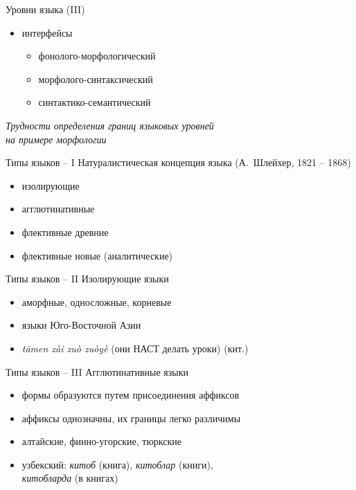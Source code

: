 \documentclass{beamer}
\begin{document}
\begin{frame}{Уровни языка (III)}
\begin{itemize}
	\item интерфейсы 
	    \begin{itemize}
	    	\item фонолого-морфологический
	    	\item морфолого-синтаксический
	    	\item синтактико-семантический
	    \end{itemize}
\end{itemize}
\end{frame}

\begin{frame}{}
\begin{center}
	\textit{Трудности определения границ языковых уровней \\на примере морфологии}
\end{center}
\end{frame}

\begin{frame}{Типы языков -- I}
Натуралистическая концепция языка (А.~Шлейхер, 1821 -- 1868)\\
\medskip
\begin{itemize}
\item изолирующие
\item агглютинативные
\item флективные древние
\item флективные новые (аналитические)
\end{itemize}
\end{frame}

\begin{frame}{Типы языков -- II}
Изолирующие языки\\
\medskip
\begin{itemize}
\item аморфные, односложные, корневые
\item языки Юго-Восточной Азии
\item \textit{t\={a}men z\`{a}i zu\`{o} zu\`{o}y\`{e}} (они НАСТ делать уроки) (кит.)
\end{itemize}
\end{frame}

\begin{frame}{Типы языков -- III}
Агглютинативные языки\\
\medskip
\begin{itemize}
\item формы образуются путем присоединения аффиксов 
\item аффиксы однозначны, их границы легко различимы
\item алтайские, финно-угорские, тюркские
\item узбекский: \textit{китоб} (книга), \textit{китоблар} (книги),\\ \textit{китобларда} (в книгах)
\end{itemize}
\end{frame}
\end{document}

